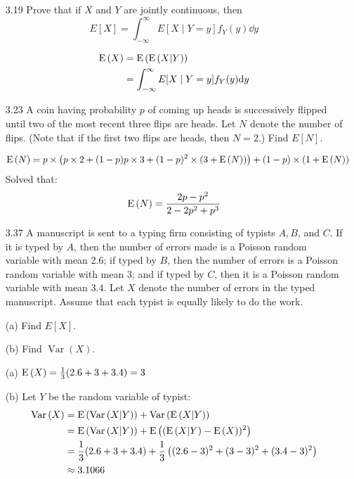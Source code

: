 \documentclass[en,hazy,blue,12pt,device = normal]{elegantnote}
\begin{document}
\begin{enumerate}
    \item[3.19] Prove that if $X$ and $Y$ are jointly continuous, then
    $$
    E[X]=\int_{-\infty}^{\infty} E[X \mid Y=y] f_Y(y) \dd y
    $$

    \begin{tcolorbox}
        \sol
        \begin{align*}
            \operatorname E\left(X\right) &= \operatorname E\left(\operatorname E\left(X|Y\right)\right)\\
            &=\int_{-\infty}^{\infty} E[X \mid Y=y] f_Y(y) \text{d} y
        \end{align*}
    \end{tcolorbox}

    \item[3.23]A coin having probability $p$ of coming up heads is successively flipped until two of the most recent three flips are heads. Let $N$ denote the number of flips. (Note that if the first two flips are heads, then $N=2$.) Find $E[N]$.
    \begin{tcolorbox}
        \sol
        \begin{align*}
            \operatorname E\left(N\right) &= p\times\left(p \times 2 + (1-p) p\times 3 + (1-p)^2 \times (3+\operatorname E\left(N\right)) \right) + (1-p) \times (1+\operatorname E\left(N\right))
        \end{align*}
        Solved that:
        \[\operatorname E\left(N\right) = \frac{2p-p^2}{2-2p^2+p^3}\]
    \end{tcolorbox}

    \item[3.37]A manuscript is sent to a typing firm consisting of typists $A, B$, and $C$. If it is typed by $A$, then the number of errors made is a Poisson random variable with mean 2.6; if typed by $B$, then the number of errors is a Poisson random variable with mean 3; and if typed by $C$, then it is a Poisson random variable with mean 3.4. Let $X$ denote the number of errors in the typed manuscript. Assume that each typist is equally likely to do the work.
    
    (a) Find $E[X]$.

    (b) Find $\operatorname{Var}(X)$.

    \begin{tcolorbox}
        \sol

        (a) \(\operatorname E\left(X\right) = \frac 1 3 (2.6+3+3.4) = 3\)

        (b) Let \(Y\) be the random variable of typist:
        \begin{align*}
            \operatorname{Var}\left(X\right) &= \operatorname E\left(\operatorname{Var}\left(X|Y\right)\right) + \operatorname{Var}\left(\operatorname E\left(X|Y\right)\right)\\
            &= \operatorname E\left(\operatorname{Var}\left(X|Y\right)\right)+ \operatorname E\left((\operatorname E\left(X|Y\right) - \operatorname E\left(X\right))^2\right)\\
            &= \frac 1 3 (2.6+3+3.4) + \frac 1 3 \left((2.6-3)^2+ (3-3)^2 + (3.4-3)^2\right)\\
            &\approx 3.1066
        \end{align*}
    \end{tcolorbox}


\end{enumerate}
\end{document}

